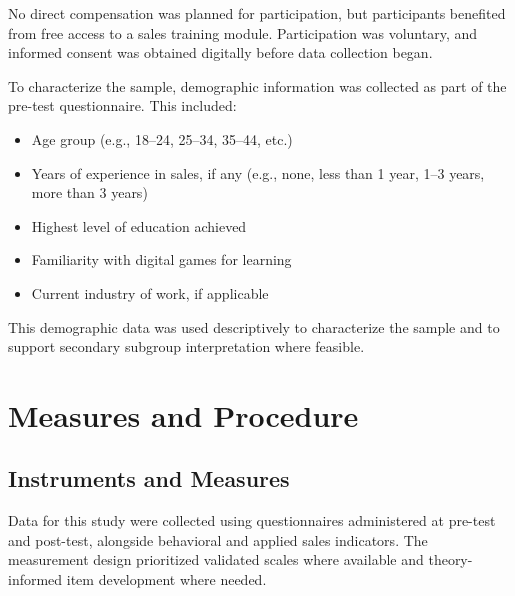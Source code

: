 \documentclass[12pt]{report}
\begin{document}
No direct compensation was planned for participation, but participants benefited from free access to a sales training module. Participation was voluntary, and informed consent was obtained digitally before data collection began.

To characterize the sample, demographic information was collected as part of the pre-test questionnaire. This included:

\begin{itemize}[leftmargin=1.2cm]
    \item Age group (e.g., 18--24, 25--34, 35--44, etc.)
    \item Years of experience in sales, if any (e.g., none, less than 1 year, 1--3 years, more than 3 years)
    \item Highest level of education achieved
    \item Familiarity with digital games for learning
    \item Current industry of work, if applicable
\end{itemize}

This demographic data was used descriptively to characterize the sample and to support secondary subgroup interpretation where feasible.

\section{Measures and Procedure}

\subsection{Instruments and Measures}
Data for this study were collected using questionnaires administered at pre-test and post-test, alongside behavioral and applied sales indicators. The measurement design prioritized validated scales where available and theory-informed item development where needed.
\end{document}
